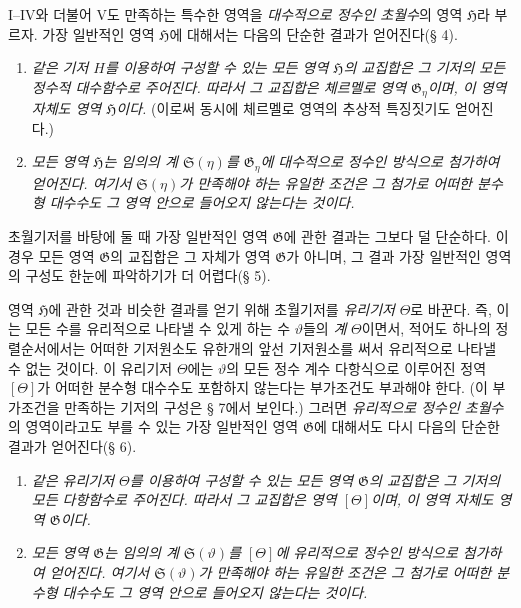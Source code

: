 I--IV와 더불어 V도 만족하는 특수한 영역을 \emph{대수적으로 정수인 초월수}의 영역 $\mathfrak H$라 부르자. 가장 일반적인 영역 $\mathfrak H$에 대해서는 다음의 단순한 결과가 얻어진다(§ 4).
\begin{enumerate}
\item[a)] \emph{같은 기저 $H$를 이용하여 구성할 수 있는 모든 영역 $\mathfrak H$의 교집합은 그 기저의 모든 정수적 대수함수로 주어진다. 따라서 그 교집합은 체르멜로 영역 $\mathfrak G_\eta$이며, 이 영역 자체도 영역 $\mathfrak H$이다.} (이로써 동시에 체르멜로 영역의 추상적 특징짓기도 얻어진다.)
\item[b)] \emph{모든 영역 $\mathfrak H$는 임의의 계 $\mathfrak S(\eta)$를 $\mathfrak G_\eta$에 대수적으로 정수인 방식으로 첨가하여 얻어진다. 여기서 $\mathfrak S(\eta)$가 만족해야 하는 유일한 조건은 그 첨가로 어떠한 분수형 대수수도 그 영역 안으로 들어오지 않는다는 것이다.}
\end{enumerate}

초월기저를 바탕에 둘 때 가장 일반적인 영역 $\mathfrak G$에 관한 결과는 그보다 덜 단순하다. 이 경우 모든 영역 $\mathfrak G$의 교집합은 그 자체가 영역 $\mathfrak G$가 아니며, 그 결과 가장 일반적인 영역의 구성도 한눈에 파악하기가 더 어렵다(§ 5).

영역 $\mathfrak H$에 관한 것과 비슷한 결과를 얻기 위해 초월기저를 \emph{유리기저} $\Theta$로 바꾼다. 즉, 이는 모든 수를 유리적으로 나타낼 수 있게 하는 수 $\vartheta$들의 \emph{계} $\Theta$이면서, 적어도 하나의 정렬순서에서는 어떠한 기저원소도 유한개의 앞선 기저원소를 써서 유리적으로 나타낼 수 없는 것이다. 이 유리기저 $\Theta$에는 $\vartheta$의 모든 정수 계수 다항식으로 이루어진 정역 $[\Theta]$가 어떠한 분수형 대수수도 포함하지 않는다는 부가조건도 부과해야 한다. (이 부가조건을 만족하는 기저의 구성은 § 7에서 보인다.) 그러면 \emph{유리적으로 정수인 초월수}의 영역이라고도 부를 수 있는 가장 일반적인 영역 $\mathfrak G$에 대해서도 다시 다음의 단순한 결과가 얻어진다(§ 6).
\begin{enumerate}
\item[a)] \emph{같은 유리기저 $\Theta$를 이용하여 구성할 수 있는 모든 영역 $\mathfrak G$의 교집합은 그 기저의 모든 다항함수로 주어진다. 따라서 그 교집합은 영역 $[\Theta]$이며, 이 영역 자체도 영역 $\mathfrak G$이다.}
\item[b)] \emph{모든 영역 $\mathfrak G$는 임의의 계 $\mathfrak S(\vartheta)$를 $[\Theta]$에 유리적으로 정수인 방식으로 첨가하여 얻어진다. 여기서 $\mathfrak S(\vartheta)$가 만족해야 하는 유일한 조건은 그 첨가로 어떠한 분수형 대수수도 그 영역 안으로 들어오지 않는다는 것이다.}
\end{enumerate}


